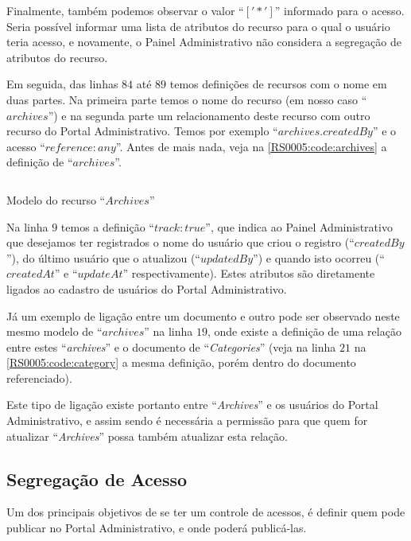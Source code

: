 Finalmente, também podemos observar o valor ``\textbf{$[ '*' ]$}'' informado para o acesso. Seria possível informar uma lista de atributos do recurso para o qual o usuário teria acesso, e novamente, o Painel Administrativo não considera a segregação de atributos do recurso.

Em seguida, das linhas $84$ até $89$ temos definições de recursos com o nome em duas partes. Na primeira parte temos o nome do recurso (em nosso caso ``$archives$'') e na segunda parte um relacionamento deste recurso com outro recurso do Portal Administrativo. Temos por exemplo ``$archives.createdBy$'' e o acesso ``\textbf{$reference:any$}''. Antes de mais nada, veja na \cref{RS0005:code:archives} a definição de ``$archives$''.

\begin{code}
    \inputminted[xleftmargin=20pt,fontsize=\footnotesize,breaklines,breakanywhere,linenos=true,label=Archive.js]{JavaScript}{../RS0005/anexos/Archive.js}
    \caption{Modelo do recurso ``$Archives$''}\label{RS0005:code:archives}
\end{code}

Na linha $9$ temos a definição ``$track: true$'', que indica ao Painel Administrativo que desejamos ter registrados o nome do usuário que criou o registro (``$createdBy$''), do último usuário que o atualizou (``$updatedBy$'') e quando isto ocorreu (``$createdAt$'' e ``$updateAt$'' respectivamente). Estes atributos são diretamente ligados ao cadastro de usuários do Portal Administrativo.

Já um exemplo de ligação entre um documento e outro pode ser observado neste mesmo modelo de ``$archives$'' na linha $19$, onde existe a definição de uma relação entre estes ``\textit{archives}'' e o documento de ``\textit{Categories}'' (veja na linha $21$ na \cref{RS0005:code:category} a mesma definição, porém dentro do documento referenciado).

Este tipo de ligação existe portanto entre ``\textit{Archives}'' e os usuários do Portal Administrativo, e assim sendo é necessária a permissão para que quem for atualizar ``\textit{Archives}'' possa também atualizar esta relação.

\subsection{Segregação de Acesso}

Um dos principais objetivos de se ter um controle de acessos, é definir quem pode publicar no Portal Administrativo, e onde poderá publicá-las.

